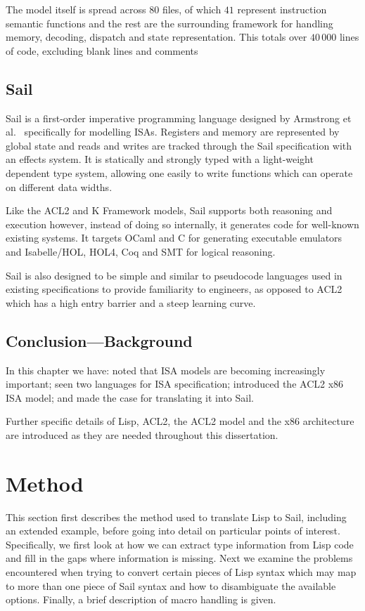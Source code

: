 \documentclass[a4paper,12pt,twoside,openright]{report}
\begin{document}
The model itself is spread across $80$ files, of which $41$ represent instruction semantic functions and the rest are the surrounding framework for handling memory, decoding, dispatch and state representation.  This totals over $40\,000$ lines of code, excluding blank lines and comments~\cite[Sec.~3.2]{goel-thesis}

\section{Sail}

Sail is a first-order imperative programming language designed by Armstrong et al.~\cite{sail-paper} specifically for modelling ISAs.  Registers and memory are represented by global state and reads and writes are tracked through the Sail specification with an effects system.  It is statically and strongly typed with a light-weight dependent type system, allowing one easily to write functions which can operate on different data widths.

Like the ACL2 and K Framework models, Sail supports both reasoning and execution however, instead of doing so internally, it generates code for well-known existing systems.  It targets OCaml and C for generating executable emulators and Isabelle/HOL, HOL4, Coq and SMT for logical reasoning.

Sail is also designed to be simple and similar to pseudocode languages used in existing specifications to provide familiarity to engineers, as opposed to ACL2 which has a high entry barrier and a steep learning curve.

\section{Conclusion---Background}

In this chapter we have: noted that ISA models are becoming increasingly important; seen two languages for ISA specification; introduced the ACL2 x86 ISA model; and made the case for translating it into Sail.

Further specific details of Lisp, ACL2, the ACL2 model and the x86 architecture are introduced as they are needed throughout this dissertation.

\hypertarget{chapter-method}{
\chapter{Method}\label{chapter-method}}

This section first describes the method used to translate Lisp to Sail, including an extended example, before going into detail on particular points of interest.  Specifically, we first look at how we can extract type information from Lisp code and fill in the gaps where information is missing.  Next we examine the problems encountered when trying to convert certain pieces of Lisp syntax which may map to more than one piece of Sail syntax and how to disambiguate the available options.  Finally, a brief description of macro handling is given.
\end{document}
